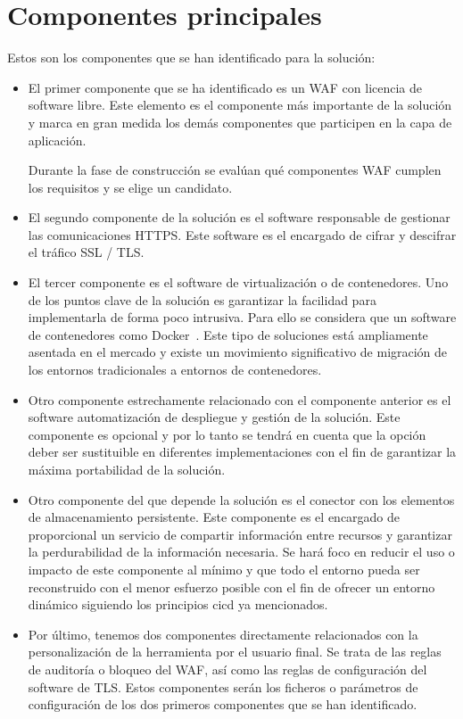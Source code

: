 \section{Componentes principales}
\par Estos son los componentes que se han identificado para la solución:
\begin{itemize}
  \item El primer componente que se ha identificado es un WAF con licencia de software libre. Este elemento es el componente más importante de la solución y
    marca en gran medida los demás componentes que participen en la capa de aplicación.
    \par Durante la fase de construcción se evalúan qué componentes WAF cumplen los requisitos y se elige un candidato.
  \item El segundo componente de la solución es el software responsable de gestionar las comunicaciones HTTPS. Este software es el encargado de cifrar y
    descifrar el tráfico SSL / TLS.
  \item El tercer componente es el software de virtualización o de contenedores. Uno de los puntos clave de la solución es garantizar la facilidad para
    implementarla de forma poco intrusiva. Para ello se considera que un software de contenedores como Docker~\cite{docker}. Este tipo de soluciones está
    ampliamente asentada en el mercado y existe un movimiento significativo de migración de los entornos tradicionales a entornos de contenedores.
  \item Otro componente estrechamente relacionado con el componente anterior es el software automatización de despliegue y gestión de la solución. Este
    componente es opcional y por lo tanto se tendrá en cuenta que la opción deber ser sustituible en diferentes implementaciones con el fin de garantizar la
    máxima portabilidad de la solución.
  \item Otro componente del que depende la solución es el conector con los elementos de almacenamiento persistente. Este componente es el encargado de
    proporcional un servicio de compartir información entre recursos y garantizar la perdurabilidad de la información necesaria. Se hará foco en reducir el uso
    o impacto de este componente al mínimo y que todo el entorno pueda ser reconstruido con el menor esfuerzo posible con el fin de ofrecer un entorno dinámico
    siguiendo los principios \acrshort{cicd} ya mencionados.
  \item Por último, tenemos dos componentes directamente relacionados con la personalización de la herramienta por el usuario final. Se trata de las reglas de
    auditoría o bloqueo del WAF, así como las reglas de configuración del software de TLS. Estos componentes serán los ficheros o parámetros de configuración de
    los dos primeros componentes que se han identificado.
\end{itemize}

